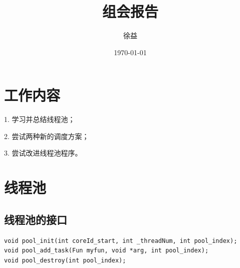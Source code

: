 \documentclass{article}
\title{组会报告}
\author{徐益}
\date{\today}
\begin{document}
\maketitle


\section{工作内容}
1. 学习并总结线程池；

2. 尝试两种新的调度方案；

3. 尝试改进线程池程序。

\section{线程池}
\subsection{线程池的接口}
\begin{lstlisting}
void pool_init(int coreId_start, int _threadNum, int pool_index);
void pool_add_task(Fun myfun, void *arg, int pool_index);
void pool_destroy(int pool_index);
\end{lstlisting}
\end{document}
